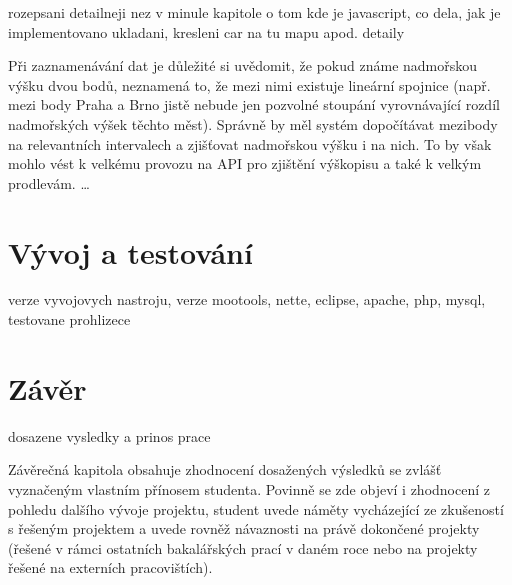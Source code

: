 rozepsani detailneji nez v minule kapitole o tom kde je javascript,
co dela, jak je implementovano ukladani, kresleni car na tu mapu
apod. detaily

Při zaznamenávání dat je důležité si uvědomit, že pokud známe
nadmořskou výšku dvou bodů, neznamená to, že mezi nimi existuje
lineární spojnice (např. mezi body Praha a Brno jistě nebude jen
pozvolné stoupání vyrovnávající rozdíl nadmořských výšek těchto
měst). Správně by měl systém dopočítávat mezibody na relevantních
intervalech a zjišťovat nadmořskou výšku i na nich. To by však mohlo
vést k velkému provozu na API pro zjištění výškopisu a také k velkým
prodlevám. \ldots

\chapter{Vývoj a testování}
verze vyvojovych nastroju, verze mootools, nette, eclipse, apache,
php, mysql, testovane prohlizece

\chapter*{Závěr}
dosazene vysledky a prinos prace

Závěrečná kapitola obsahuje zhodnocení dosažených výsledků se zvlášť
vyznačeným vlastním přínosem studenta. Povinně se zde objeví i
zhodnocení z pohledu dalšího vývoje projektu, student uvede náměty
vycházející ze zkušeností s řešeným projektem a uvede rovněž
návaznosti na právě dokončené projekty (řešené v rámci ostatních
bakalářských prací v daném roce nebo na projekty řešené na externích
pracovištích).
